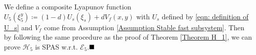  We define a composite Lyapunov function $U_5(\xi_5^y)\coloneqq (1-d) {U_s}(\xi_s) + d{V_f}(x,y)$ with $U_s$ defined by \eqref{eqn: definition of U_s} and $V_f$ come from Assumption \ref{Assumption Stable fast subsystem}.
%
Then by following the same procedure as the proof of Theorem \ref{Theorem H_1}, we can prove $\mathcal{H}_5$ is SPAS w.r.t. $\mathcal{E}_5$.$\hfill\blacksquare$

